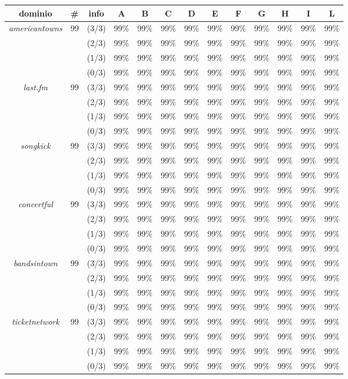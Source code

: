\documentclass[a4paper]{report}
\begin{document}
\begin{tabular}{|ccccccccccccc|}
\hline
dominio & \# & info & A &  B & C & D & E & F & G & H & I & L\\
\hline
\textit{americantowns} &99 & (3/3) & 99\%& 99\%& 99\%& 99\%& 99\%& 99\%& 99\%& 99\%& 99\% & 99\% \\
& & (2/3) & 99\%& 99\%& 99\%& 99\%& 99\%& 99\%& 99\%& 99\%& 99\% & 99\% \\
& & (1/3) & 99\%& 99\%& 99\%& 99\%& 99\%& 99\%& 99\%& 99\%& 99\% & 99\% \\
& & (0/3) & 99\%& 99\%& 99\%& 99\%& 99\%& 99\%& 99\%& 99\%& 99\% & 99\% \\
\hline
\textit{last.fm} &99 & (3/3) & 99\%& 99\%& 99\%& 99\%& 99\%& 99\%& 99\%& 99\%& 99\% & 99\% \\
& & (2/3) & 99\%& 99\%& 99\%& 99\%& 99\%& 99\%& 99\%& 99\%& 99\% & 99\% \\
& & (1/3) & 99\%& 99\%& 99\%& 99\%& 99\%& 99\%& 99\%& 99\%& 99\% & 99\% \\
& & (0/3) & 99\%& 99\%& 99\%& 99\%& 99\%& 99\%& 99\%& 99\%& 99\% & 99\% \\
\hline
\textit{songkick} &99 & (3/3) & 99\%& 99\%& 99\%& 99\%& 99\%& 99\%& 99\%& 99\%& 99\% & 99\% \\
& & (2/3) & 99\%& 99\%& 99\%& 99\%& 99\%& 99\%& 99\%& 99\%& 99\% & 99\% \\
& & (1/3) & 99\%& 99\%& 99\%& 99\%& 99\%& 99\%& 99\%& 99\%& 99\% & 99\% \\
& & (0/3) & 99\%& 99\%& 99\%& 99\%& 99\%& 99\%& 99\%& 99\%& 99\% & 99\% \\
\hline
\textit{concertful} &99 & (3/3) & 99\%& 99\%& 99\%& 99\%& 99\%& 99\%& 99\%& 99\%& 99\% & 99\% \\
& & (2/3) & 99\%& 99\%& 99\%& 99\%& 99\%& 99\%& 99\%& 99\%& 99\% & 99\% \\
& & (1/3) &99\%& 99\%& 99\%& 99\%& 99\%& 99\%& 99\%& 99\%& 99\% & 99\% \\
& & (0/3) & 99\%& 99\%& 99\%& 99\%& 99\%& 99\%& 99\%& 99\%& 99\% & 99\% \\
\hline
\textit{bandsintown} &99 & (3/3) & 99\%& 99\%& 99\%& 99\%& 99\%& 99\%& 99\%& 99\%& 99\% & 99\% \\
& & (2/3) & 99\%& 99\%& 99\%& 99\%& 99\%& 99\%& 99\%& 99\%& 99\% & 99\% \\
& & (1/3) & 99\%& 99\%& 99\%& 99\%& 99\%& 99\%& 99\%& 99\%& 99\% & 99\% \\
& & (0/3) & 99\%& 99\%& 99\%& 99\%& 99\%& 99\%& 99\%& 99\%& 99\% & 99\% \\
\hline
\textit{ticketnetwork} &99 & (3/3) & 99\%& 99\%& 99\%& 99\%& 99\%& 99\%& 99\%& 99\%& 99\% & 99\% \\
& & (2/3) & 99\%& 99\%& 99\%& 99\%& 99\%& 99\%& 99\%& 99\%& 99\% & 99\% \\
& & (1/3) & 99\%& 99\%& 99\%& 99\%& 99\%& 99\%& 99\%& 99\%& 99\% & 99\% \\
& & (0/3) & 99\%& 99\%& 99\%& 99\%& 99\%& 99\%& 99\%& 99\%& 99\% & 99\% \\
\hline
\end{tabular}
\end{document}
